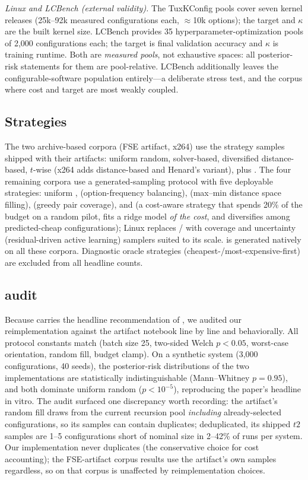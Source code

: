 \emph{Linux and LCBench (external validity).} The TuxKConfig pools
\citep{martin2022transfer} cover seven kernel releases (25k--92k measured
configurations each, $\approx$10k options); the target and $\kappa$ are
the built kernel size. LCBench \citep{zimmer2021autopytorch} provides 35
hyperparameter-optimization pools of 2{,}000 configurations each; the
target is final validation accuracy and $\kappa$ is training runtime.
Both are \emph{measured pools}, not exhaustive spaces: all posterior-risk
statements for them are pool-relative. LCBench additionally leaves the
configurable-software population entirely---a deliberate stress test, and
the corpus where cost and target are most weakly coupled.

\subsection{Strategies}
\label{sec:strategies}

The two archive-based corpora (FSE artifact, x264) use the strategy
samples shipped with their artifacts: uniform random, solver-based,
diversified distance-based, $t$-wise (x264 adds distance-based and
Henard's variant), plus \srs. The four remaining corpora use a
generated-sampling protocol with five deployable strategies:
uniform \randomS, \balanced{} (option-frequency balancing),
\diShe{} (max--min distance space filling), \pairwise{} (greedy pair
coverage), and \pilotcost{} (a cost-aware strategy that spends 20\% of
the budget on a random pilot, fits a ridge model \emph{of the cost}, and
diversifies among predicted-cheap configurations); Linux replaces
\pairwise/\pilotcost{} with \textsf{coverage} and \textsf{uncertainty}
(residual-driven active learning) samplers suited to its scale. \srs{} is
generated natively on all these corpora. Diagnostic oracle strategies
(cheapest-/most-expensive-first) are excluded from all headline counts.

\subsection{\srs{} audit}
\label{sec:srsaudit}

Because \srs{} carries the headline recommendation of
\citet{weis2026risk}, we audited our reimplementation against the
artifact notebook line by line and behaviorally. All protocol constants
match (batch size 25, two-sided Welch $p<0.05$, worst-case orientation,
random fill, budget clamp). On a synthetic system (3{,}000
configurations, 40 seeds), the posterior-risk distributions of the two
implementations are statistically indistinguishable (Mann--Whitney
$p=0.95$), and both dominate uniform random ($p<10^{-5}$), reproducing
the paper's headline in vitro. The audit surfaced one discrepancy worth
recording: the artifact's random fill draws from the current recursion
pool \emph{including} already-selected configurations, so its samples can
contain duplicates; dedu\-pli\-cated, its shipped $t2$ \srs{} samples are
1--5 configurations short of nominal size in 2--42\% of runs per system.
Our implementation never duplicates (the conservative choice for cost
accounting); the FSE-artifact corpus results use the artifact's own
samples regardless, so \rqone{} on that corpus is unaffected by
reimplementation choices.


